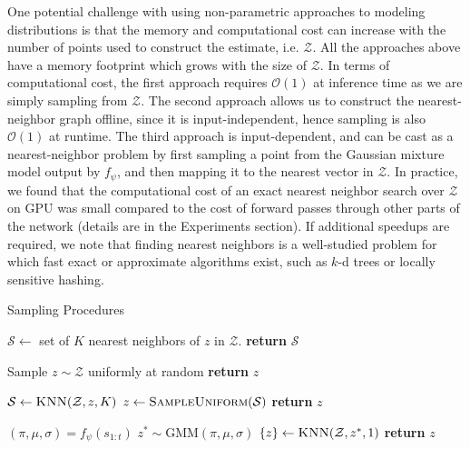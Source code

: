 \documentclass{article}
\begin{document}
One potential challenge with using non-parametric approaches to modeling distributions is that the memory and computational cost can increase with the number of points used to construct the estimate, i.e. $\mathcal{Z}$.
All the approaches above have a memory footprint which grows with the size of $\mathcal{Z}$.
In terms of computational cost, the first approach requires $\mathcal{O}(1)$ at inference time as we are simply sampling from $\mathcal{Z}$.
The second approach allows us to construct the nearest-neighbor graph offline, since it is input-independent, hence sampling is also $\mathcal{O}(1)$ at runtime.
The third approach is input-dependent, and can be cast as a nearest-neighbor problem by first sampling a point from the Gaussian mixture model output by $f_\psi$, and then mapping it to the nearest vector in $\mathcal{Z}$.
In practice, we found that the computational cost of an exact nearest neighbor search over $\mathcal{Z}$ on GPU was small compared to the cost of forward passes through other parts of the network (details are in the Experiments section).
If additional speedups are required, we note that finding nearest neighbors is a well-studied problem for which fast exact or approximate algorithms exist, such as $k$-d trees or locally sensitive hashing.




\begin{algorithm}[t]
  \caption{Sampling Procedures}\label{algo-sample}
  \begin{algorithmic}[1]

    \State $\mathcal{S} \gets $ set of $K$ nearest neighbors of $z$ in $\mathcal{Z}$.
    \State \textbf{return} $\mathcal{S}$
    \EndProcedure


    \State Sample $z \sim \mathcal{Z}$ uniformly at random
    \State \textbf{return} $z$
    \EndProcedure

    \State $\mathcal{S} \gets \textsc{KNN}(\mathcal{Z}, z, K)$
    \State $z \gets \textsc{SampleUniform}(\mathcal{S})$
    \State \textbf{return} $z$
    \EndProcedure

    \State $(\pi, \mu, \sigma) = f_\psi(s_{1:t})$
    \State $z^* \sim \mbox{GMM}(\pi, \mu, \sigma)$
    \State $\{z\} \gets \textsc{KNN}(\mathcal{Z}, z^*, 1)$
    \State \textbf{return} $z$
    \EndProcedure
  \end{algorithmic}
\end{algorithm}
\end{document}

